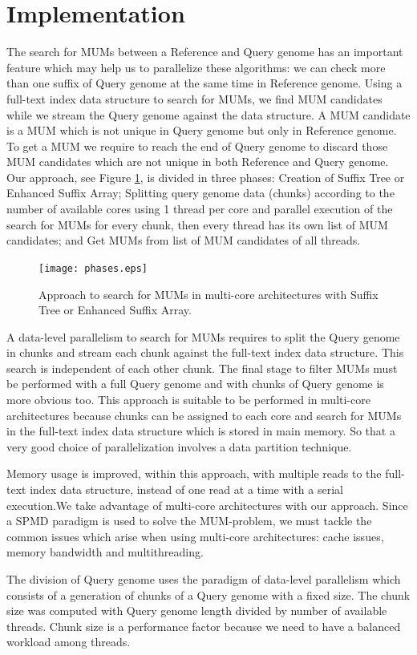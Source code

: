 \documentclass[runningheads,a5paper]{llncs}
\begin{document}
\section{Implementation}
The search for MUMs between a Reference and Query genome has an important feature which may help us to parallelize these algorithms: we can check more than one suffix of Query genome at the same time in Reference genome. Using a full-text index data structure to search for MUMs, we find MUM candidates while we stream the Query genome against the data structure. A MUM candidate is a MUM which is not unique in Query genome but only in Reference genome. To get a MUM we require to reach the end of Query genome to discard those MUM candidates which are not unique in both Reference and Query genome. Our approach, see Figure \ref{phases}, is divided in three phases: Creation of Suffix Tree or Enhanced Suffix Array; Splitting query genome data (chunks) according to the number of available cores using 1 thread per core and parallel execution of the search for MUMs for every chunk, then every thread has its own list of MUM candidates; and Get MUMs from list of MUM candidates of all threads. 
\begin{figure}
\centering 
\texttt{[image: phases.eps]}
\caption{Approach to search for MUMs in multi-core architectures with Suffix Tree or Enhanced Suffix Array.}
  \label{phases}
\end{figure}
A data-level parallelism to search for MUMs requires to split the Query genome in chunks and stream each chunk against the full-text index data structure. This search is independent of each other chunk. The final stage to filter MUMs must be performed with a full Query genome and with chunks of Query genome is more obvious too. This approach is suitable to be performed in multi-core architectures because chunks can be assigned to each core and search for MUMs in the full-text index data structure which is stored in main memory. So that a very good choice of parallelization involves a data partition technique.

Memory usage is improved, within this approach, with multiple reads to the full-text index data structure, instead of one read at a time with a serial execution.We take advantage of multi-core architectures with our approach. Since a SPMD paradigm is used to solve the MUM-problem, we must tackle the common issues which arise when using multi-core architectures: cache issues, memory bandwidth and multithreading.

The division of Query genome uses the paradigm of data-level parallelism which consists of a generation of chunks of a Query genome with a fixed size. The chunk size was computed with Query genome length divided by number of available threads. Chunk size is a performance factor because we need to have a balanced workload among threads.
\end{document}

